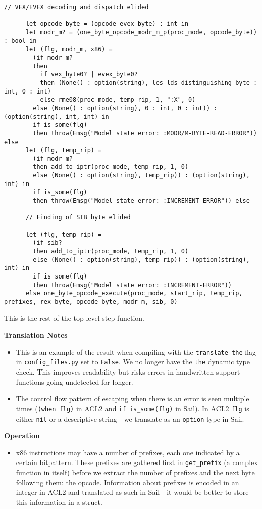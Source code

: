 \documentclass[a4paper]{article}
\begin{document}
\begin{tcolorbox}[breakable]
\begin{parcolumns}{2}
{\begin{lstlisting}[language=sail]
      // VEX/EVEX decoding and dispatch elided

      let opcode_byte = (opcode_evex_byte) : int in
      let modr_m? = (one_byte_opcode_modr_m_p(proc_mode, opcode_byte)) : bool in
      let (flg, modr_m, x86) =
        (if modr_m?
        then
          if vex_byte0? | evex_byte0?
          then (None() : option(string), les_lds_distinguishing_byte : int, 0 : int)
          else rme08(proc_mode, temp_rip, 1, ":X", 0)
        else (None() : option(string), 0 : int, 0 : int)) : (option(string), int, int) in
        if is_some(flg)
        then throw(Emsg("Model state error: :MODR/M-BYTE-READ-ERROR")) else
      let (flg, temp_rip) =
        (if modr_m?
        then add_to_iptr(proc_mode, temp_rip, 1, 0)
        else (None() : option(string), temp_rip)) : (option(string), int) in
        if is_some(flg)
        then throw(Emsg("Model state error: :INCREMENT-ERROR")) else

      // Finding of SIB byte elided

      let (flg, temp_rip) =
        (if sib?
        then add_to_iptr(proc_mode, temp_rip, 1, 0)
        else (None() : option(string), temp_rip)) : (option(string), int) in
        if is_some(flg)
        then throw(Emsg("Model state error: :INCREMENT-ERROR"))
      else one_byte_opcode_execute(proc_mode, start_rip, temp_rip, prefixes, rex_byte, opcode_byte, modr_m, sib, 0)
\end{lstlisting}
}
\colplacechunks
\end{parcolumns}

This is the rest of the top level step function.

\noindent
\textbf{Translation Notes}
\begin{itemize}
  \item This is an example of the result when compiling with the \texttt{translate\_the} flag in \texttt{config\_files.py} set to \texttt{False}.  We no longer have the \texttt{the} dynamic type check.  This improves readability but risks errors in handwritten support functions going undetected for longer.

  \item The control flow pattern of escaping when there is an error is seen multiple times (\texttt{(when flg)} in ACL2 and \texttt{if is\_some(flg)} in Sail).  In ACL2 \texttt{flg} is either \texttt{nil} or a descriptive string---we translate as an \texttt{option} type in Sail.
\end{itemize}

\noindent
\textbf{Operation}
\begin{itemize}
  \item x86 instructions may have a number of prefixes, each one indicated by a certain bitpattern.  These prefixes are gathered first in \texttt{get\_prefix} (a complex function in itself) before we extract the number of prefixes and the next byte following them: the opcode.  Information about prefixes is encoded in an integer in ACL2 and translated as such in Sail---it would be better to store this information in a struct.


\end{itemize}
\end{tcolorbox}
\end{document}
